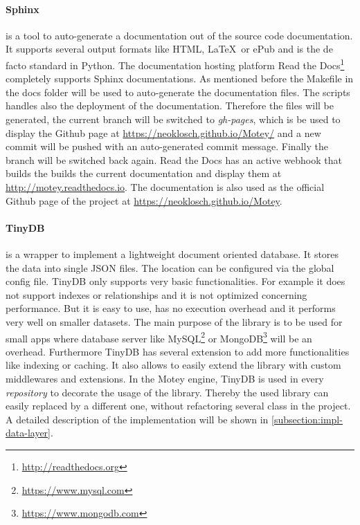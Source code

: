 \paragraph{Sphinx} is a tool to auto-generate a documentation out of the source code documentation.
It supports several output formats like \ac{HTML}, \LaTeX\ or ePub and is the de facto standard in Python.
The documentation hosting platform Read the Docs\footnote{\url{http://readthedocs.org}} completely supports Sphinx documentations.
As mentioned before the Makefile in the docs folder will be used to auto-generate the documentation files.
The scripts handles also the deployment of the documentation.
Therefore the files will be generated, the current branch will be switched to \textit{gh-pages}, which is be used to display the Github page at \url{https://neoklosch.github.io/Motey/} and a new commit will be pushed with an auto-generated commit message.
Finally the branch will be switched back again.
Read the Docs has an active webhook that builds the builds the current documentation and display them at \url{http://motey.readthedocs.io}.
The documentation is also used as the official Github page of the project at \url{https://neoklosch.github.io/Motey}.

\paragraph{TinyDB} is a wrapper to implement a lightweight document oriented database.
It stores the data into single \ac{JSON} files.
The location can be configured via the global config file.
TinyDB only supports very basic functionalities.
For example it does not support indexes or relationships and it is not optimized concerning performance.
But it is easy to use, has no execution overhead and it performs very well on smaller datasets.
The main purpose of the library is to be used for small apps where database server like MySQL\footnote{\url{https://www.mysql.com}} or MongoDB\footnote{\url{https://www.mongodb.com}} will be an overhead.
Furthermore TinyDB has several extension to add more functionalities like indexing or caching.
It also allows to easily extend the library with custom middlewares and extensions.
In the Motey engine, TinyDB is used in every \textit{repository} to decorate the usage of the library.
Thereby the used library can easily replaced by a different one, without refactoring several class in the project.
A detailed description of the implementation will be shown in \ref{subsection:impl-data-layer}.

